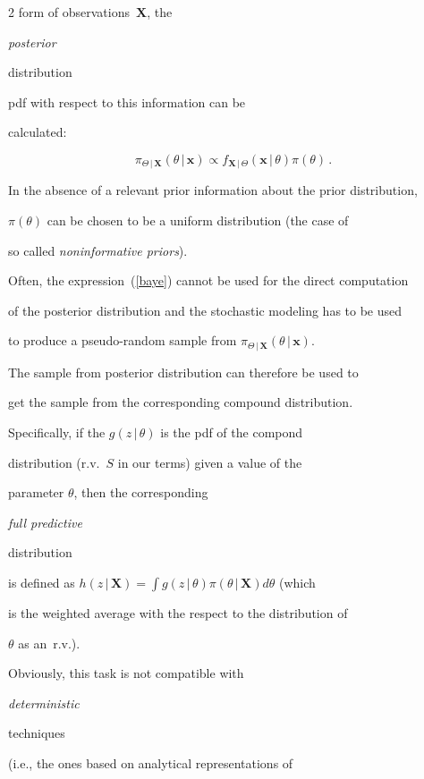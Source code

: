 \begin{multicols}{2}
form of observations~$\mathbf{X}$, the {\it posterior

distribution} pdf with respect to this information can be

calculated:

\begin{equation}

\label{baye}

\pi_{\Theta\,|\,\mathbf{X}}(\theta\,|\,\mathbf{x})\propto f_{\mathbf{X}\,|\,\Theta}

(\mathbf{x}\,|\,\theta)\pi(\theta)\,.

\end{equation}

In the absence of a relevant prior information about the prior distribution,

 $\pi(\theta)$ can be chosen to be a uniform distribution (the case of

 so called {\it noninformative priors}).



Often, the expression~(\ref{baye}) cannot be used for the direct computation

of the posterior distribution and the stochastic modeling has to be used

to produce a pseudo-random sample from $\pi_{\Theta\,|\,\mathbf{X}}(\theta\,|\,\mathbf{x})$.





The sample from posterior distribution can therefore be used to

get the sample from the corresponding compound distribution.

Specifically, if the $g(z\,|\,\theta)$ is the pdf of the compond

distribution (r.v.~$S$ in our terms) given a value of the

parameter $\theta$, then the corresponding {\it full predictive

distribution} is defined as $h(z\,|\,\mathbf{X})=\int

g(z\,|\,\theta)\pi(\theta\,|\,\mathbf{X})d\theta$ (which

is the weighted average with the respect to the distribution of

$\theta$ as an~r.v.).



Obviously, this task is not compatible with {\it deterministic

techniques} (i.e., the ones based on analytical representations of


\end{multicols}
